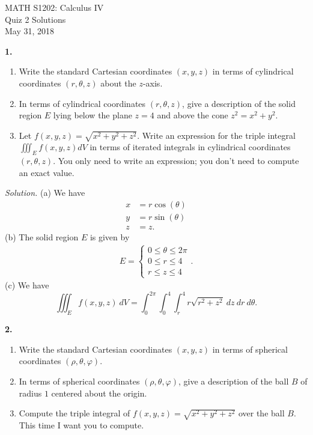 \documentclass{article}
\begin{document}
\begin{center}
MATH S1202: Calculus IV \\ 
Quiz 2 Solutions \\
May 31, 2018
\end{center}


\noindent \textbf{1.} 
\begin{enumerate}
\item[(a)] Write the standard Cartesian coordinates $(x,y,z)$ in terms of cylindrical coordinates $(r, \theta, z)$ about the $z$-axis.
\item[(b)] In terms of cylindrical coordinates $(r, \theta, z)$, give a description of the solid region $E$ lying below the plane $z = 4$ and above the cone $z^2 = x^2 + y^2$. 
\item[(c)] Let $f(x,y,z) = \sqrt{x^2 + y^2 + z^2}$. Write an expression for the triple integral $\iiint_E f(x,y,z) dV$ in terms of iterated integrals in cylindrical coordinates $(r, \theta, z)$. You only need to write an expression; you don't need to compute an exact value. \end{enumerate}

\vspace{3mm}

{\color{blue}
\noindent \emph{Solution.} (a) We have 
\begin{align*}
x &= r \cos(\theta) \\
y &= r \sin(\theta) \\
z &= z.
\end{align*}
(b) The solid region $E$ is given by 
\begin{align*}
E = \begin{cases}
0 \leqslant \theta \leqslant 2\pi \\
0 \leqslant r \leqslant 4 \\
r \leqslant z \leqslant 4
\end{cases}.
\end{align*}
(c) We have 
\[
\iiint_E f(x,y,z) \: dV = \int_0^{2\pi} \int_{0}^4 \int_{r}^4 r \sqrt{r^2 + z^2} \: dz \: dr \: d\theta.
\]
}


\noindent \textbf{2.} 
\begin{enumerate}
\item[(a)] Write the standard Cartesian coordinates $(x,y,z)$ in terms of spherical coordinates $(\rho, \theta, \varphi)$.  
\item[(b)] In terms of spherical coordinates $(\rho, \theta, \varphi)$, give a description of the ball $B$ of radius $1$ centered about the origin. 
\item[(c)] Compute the triple integral of $f(x,y,z) = \sqrt{x^2 + y^2 + z^2}$ over the ball $B$. This time I want you to compute. 
\end{enumerate}
\end{document}
